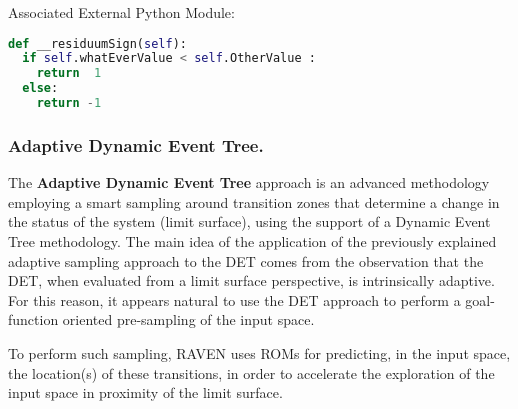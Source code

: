 Associated External Python Module:
\begin{lstlisting}[language=python]
def __residuumSign(self):
  if self.whatEverValue < self.OtherValue :
    return  1
  else:
    return -1
\end{lstlisting}

\subsubsection{Adaptive Dynamic Event Tree.}
\label{subsubsubsec:ADET}
The \textbf{Adaptive Dynamic Event Tree} approach is an advanced methodology 
employing a smart sampling around transition zones that determine a change in
the status of the system (limit surface), using the support of a Dynamic Event
Tree methodology.
%
The main idea of the application of the previously explained adaptive sampling
approach to the DET comes from the observation that the DET, when evaluated from
a limit surface perspective, is intrinsically adaptive.
%
For this reason, it appears natural to use the DET approach to perform a
goal-function oriented pre-sampling of the input space.

To perform such sampling, RAVEN uses ROMs for predicting, in the input space,
the location(s) of these transitions, in order to accelerate the exploration of
the input space in proximity of the limit surface.

%
\attrIntro

